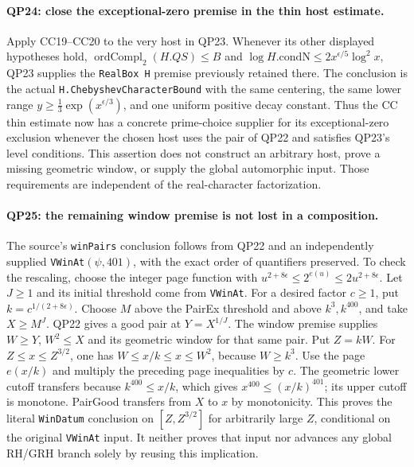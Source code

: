 \paragraph{QP24: close the exceptional-zero premise in the thin host estimate.}
Apply CC19--CC20 to the very host in QP23.
Whenever its other displayed hypotheses hold,
$\operatorname{ordCompl}_2(H.QS)\le B$ and
$\log H.\mathrm{condN}\le2x^{\epsilon/5}\log^2x$,
QP23 supplies the \texttt{RealBox H} premise previously retained there.
The conclusion is the actual \texttt{H.ChebyshevCharacterBound}
with the same centering, the same lower range
$y\ge\frac13\exp(x^{\epsilon/3})$, and one uniform positive decay
constant.  Thus the CC thin estimate now has a concrete prime-choice
supplier for its exceptional-zero exclusion whenever the chosen host
uses the pair of QP22 and satisfies QP23's level conditions.
This assertion does not construct an arbitrary host, prove a missing
geometric window, or supply the global automorphic input.  Those
requirements are independent of the real-character factorization.

\paragraph{QP25: the remaining window premise is not lost in a composition.}
The source's \texttt{winPairs} conclusion follows from QP22 and an
independently supplied \texttt{VWinAt}$(\psi,401)$, with the exact order
of quantifiers preserved.  To check the rescaling, choose the integer
page function with
$u^{2+8\epsilon}\le2^{e(u)}\le2u^{2+8\epsilon}$.
Let $J\ge1$ and its initial threshold come from \texttt{VWinAt}.
For a desired factor $c\ge1$, put $k=c^{1/(2+8\epsilon)}$.
Choose $M$ above the PairEx threshold and above $k^3,k^{400}$, and take
$X\ge M^J$.  QP22 gives a good pair at $Y=X^{1/J}$.
The window premise supplies $W\ge Y$, $W^2\le X$ and its geometric
window for that same pair.  Put $Z=kW$.
For $Z\le x\le Z^{3/2}$, one has
$W\le x/k\le x\le W^2$, because $W\ge k^3$.
Use the page $e(x/k)$ and multiply the preceding page inequalities by
$c$.  The geometric lower cutoff transfers because
$k^{400}\le x/k$, which gives
$x^{400}\le(x/k)^{401}$; its upper cutoff is monotone.
PairGood transfers from $X$ to $x$ by monotonicity.
This proves the literal \texttt{WinDatum} conclusion on
$[Z,Z^{3/2}]$ for arbitrarily large $Z$, conditional on the original
\texttt{VWinAt} input.  It neither proves that input nor advances any
global RH/GRH branch solely by reusing this implication.
